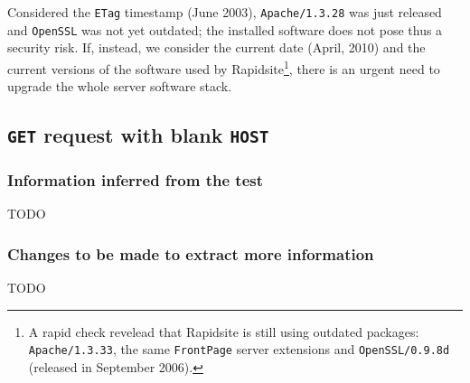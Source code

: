 Considered the {\tt ETag} timestamp (June 2003), {\tt Apache/1.3.28} was just released and {\tt OpenSSL} was not yet outdated; the installed software does not pose thus a security risk. If, instead, we consider the current date (April, 2010) and the current versions of the software used by Rapidsite\footnote{A rapid check revelead that Rapidsite is still using outdated packages: {\tt Apache/1.3.33}, the same {\tt FrontPage} server extensions and {\tt OpenSSL/0.9.8d} (released in September 2006).}, there is an urgent need to upgrade the whole server software stack.



\subsection{\texttt{GET} request with blank \texttt{HOST}}

\subsubsection{Information inferred from the test}
TODO

\subsubsection{Changes to be made to extract more information}
TODO

